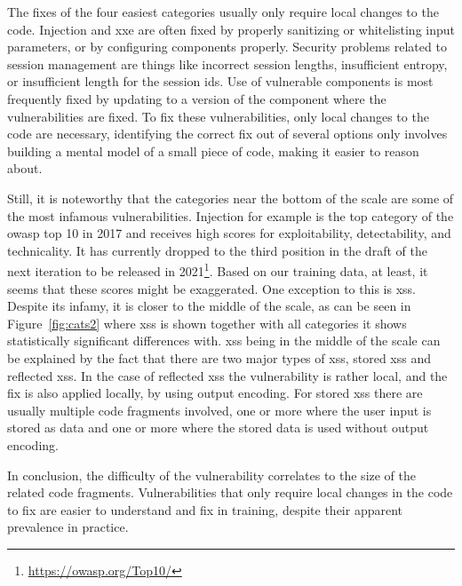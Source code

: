 The fixes of the four easiest categories usually only require local changes to the code.
Injection and \gls{xxe} are often fixed by properly sanitizing or whitelisting input parameters, or by configuring components properly.
Security problems related to session management are things like incorrect session lengths, insufficient entropy, or insufficient length for the session \glspl{id}.
Use of vulnerable components is most frequently fixed by updating to a version of the component where the vulnerabilities are fixed.
To fix these vulnerabilities, only local changes to the code are necessary, identifying the correct fix out of several options only involves building a mental model of a small piece of code, making it easier to reason about.

Still, it is noteworthy that the categories near the bottom of the scale are some of the most infamous vulnerabilities.
Injection for example is the top category of the \gls{owasp} top 10 in 2017 and receives high scores for exploitability, detectability, and technicality.
It has currently dropped to the third position in the draft of the next iteration to be released in 2021\footnote{\url{https://owasp.org/Top10/}}.
Based on our training data, at least, it seems that these scores might be exaggerated.
One exception to this is \gls{xss}.
Despite its infamy, it is closer to the middle of the scale, as can be seen in Figure~\ref{fig:cats2} where \gls{xss} is shown together with all categories it shows statistically significant differences with.
\Gls{xss} being in the middle of the scale can be explained by the fact that there are two major types of \gls{xss}, stored \gls{xss} and reflected \gls{xss}. 
In the case of reflected \gls{xss} the vulnerability is rather local, and the fix is also applied locally, by using output encoding.
For stored \gls{xss} there are usually multiple code fragments involved, one or more where the user input is stored as data and one or more where the stored data is used without output encoding.

In conclusion, the difficulty of the vulnerability correlates to the size of the related code fragments.
Vulnerabilities that only require local changes in the code to fix are easier to understand and fix in training, despite their apparent prevalence in practice.

